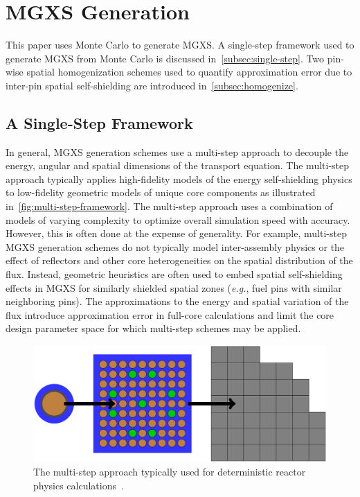 \section{MGXS Generation}
\label{sec:mgxs-generation}

This paper uses Monte Carlo to generate MGXS. A single-step framework used to generate MGXS from Monte Carlo is discussed in~\autoref{subsec:single-step}. Two pin-wise spatial homogenization schemes used to quantify approximation error due to inter-pin spatial self-shielding are introduced in~\autoref{subsec:homogenize}.


\subsection{A Single-Step Framework}
\label{subsec:single-step}

In general, MGXS generation schemes use a multi-step approach to decouple the energy, angular and spatial dimensions of the transport equation. The multi-step approach typically applies high-fidelity models of the energy self-shielding physics to low-fidelity geometric models of unique core components as illustrated in~\autoref{fig:multi-step-framework}. The multi-step approach uses a combination of models of varying complexity to optimize overall simulation speed with accuracy. However, this is often done at the expense of generality. For example, multi-step MGXS generation schemes do not typically model inter-assembly physics or the effect of reflectors and other core heterogeneities on the spatial distribution of the flux. Instead, geometric heuristics are often used to embed spatial self-shielding effects in MGXS for similarly shielded spatial zones (\textit{e.g.}, fuel pins with similar neighboring pins). The approximations to the energy and spatial variation of the flux introduce approximation error in full-core calculations and limit the core design parameter space for which multi-step schemes may be applied. 

\begin{figure}[h!]
\centering
\includegraphics[width=\linewidth]{figures/multi-step-flow-chart}
\caption{The multi-step approach typically used for deterministic reactor physics calculations~\citep{gibson2016thesis}.}
\label{fig:multi-step-framework}
\end{figure}

